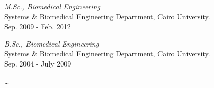 \documentclass[10pt,a4paper]{scrartcl}
\begin{document}
    \begin{cv}{}
        \begin{cvlist}{}\label{PersDat}  
            \item  \textit{M.Sc., Biomedical Engineering} \\
             Systems \& Biomedical Engineering Department, Cairo University.\\
             {Sep. 2009 - Feb. 2012}
             
             \item  \textit{B.Sc., Biomedical Engineering} \\
             Systems \& Biomedical Engineering Department, Cairo University.\\
             {Sep. 2004 - July 2009}	
        \end{cvlist}
        
        \begin{cvlist}{}\label{irgendwas}
            \item   \dots 
        \end{cvlist}
    \end{cv}
\end{document}
